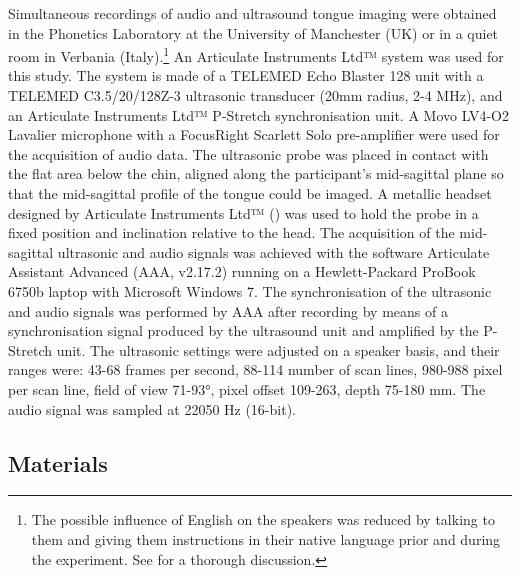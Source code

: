 \documentclass[preprint]{JASAnew}
\begin{document}
Simultaneous recordings of audio and ultrasound tongue imaging were
obtained in the Phonetics Laboratory at the University of Manchester
(UK) or in a quiet room in Verbania
(Italy).\footnote{The possible influence of English on the speakers was reduced by talking to them and giving them instructions in their native language prior and during the experiment. See \citet{coretta2018j} for a thorough discussion.}
An Articulate Instruments Ltd™ system was used for this study. The
system is made of a TELEMED Echo Blaster 128 unit with a TELEMED
C3.5/20/128Z-3 ultrasonic transducer (20mm radius, 2-4 MHz), and an
Articulate Instruments Ltd™ P-Stretch synchronisation unit. A Movo
LV4-O2 Lavalier microphone with a FocusRight Scarlett Solo pre-amplifier
were used for the acquisition of audio data. The ultrasonic probe was
placed in contact with the flat area below the chin, aligned along the
participant's mid-sagittal plane so that the mid-sagittal profile of the
tongue could be imaged. A metallic headset designed by Articulate
Instruments Ltd™ (\citeyear{articulate2008}) was used to hold the probe
in a fixed position and inclination relative to the head. The
acquisition of the mid-sagittal ultrasonic and audio signals was
achieved with the software Articulate Assistant Advanced (AAA, v2.17.2)
running on a Hewlett-Packard ProBook 6750b laptop with Microsoft Windows
7. The synchronisation of the ultrasonic and audio signals was performed
by AAA after recording by means of a synchronisation signal produced by
the ultrasound unit and amplified by the P-Stretch unit. The ultrasonic
settings were adjusted on a speaker basis, and their ranges were: 43-68
frames per second, 88-114 number of scan lines, 980-988 pixel per scan
line, field of view 71-93°, pixel offset 109-263, depth 75-180 mm. The
audio signal was sampled at 22050 Hz (16-bit).

\hypertarget{materials}{%
\subsection{Materials}\label{materials}}
\end{document}
